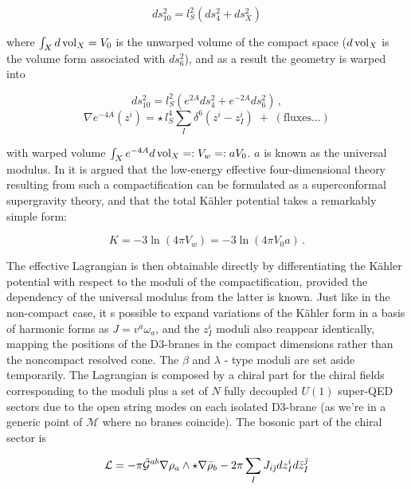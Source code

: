 \begin{equation}
	ds_{10}^2 = l_S^2 (ds^2_4 + ds^2_X)
	\label{}
\end{equation}

where $\int_X d\operatorname{vol}_X = V_0$ is the unwarped volume of the compact space ($d\operatorname{vol}_X$ is the volume form associated with $ds_6^2$), and as a result the geometry is warped into

\begin{equation}
	ds_{10}^2 = l_S^2 ( e^{2A} ds^2_4 + e^{-2A} ds^2_6 )\,,
\end{equation}
\begin{equation}
	\nabla e^{-4A}(z^i) = \star \, l_S^4 \sum_I \delta^6(z^i - z_I^i) \; + \; (\text {fluxes}\ldots)
	\label{}
\end{equation}

with warped volume $\int_X e^{-4A} d\operatorname{vol}_X =: V_w =: a V_0$. $a$ is known as the universal modulus. In \cite{MZ_2} it is argued that the low-energy effective four-dimensional theory resulting from such a compactification can be formulated as a superconformal supergravity theory, and that the total K\"ahler potential takes a remarkably simple form:

\begin{equation}
	K = -3 \ln(4\pi V_w) = -3 \ln(4 \pi V_0 a)\,.
	\label{}
\end{equation}

The effective Lagrangian is then obtainable directly by differentiating the K\"ahler potential with respect to the moduli of the compactification, provided the dependency of the universal modulus from the latter is known. Just like in the non-compact case, it s possible to expand variations of the K\"ahler form in a basis of harmonic forms as $J = v^a \omega_a$, and the $z_I^i$ moduli also reappear identically, mapping the positions of the D3-branes in the compact dimensions rather than the noncompact resolved cone. The $\beta$ and $\lambda$ - type moduli are set aside temporarily. The Lagrangian is composed by a chiral part for the chiral fields corresponding to the moduli plus a set of $N$ fully decoupled $U(1)$ super-QED sectors due to the open string modes on each isolated D3-brane (as we're in a generic point of $\mathcal{M}$ where no branes coincide). The bosonic part of the chiral sector is

\begin{equation}
	\mathcal{L} = - \pi \tilde{\mathcal{G}}^{ab} \nabla \rho_a \wedge \star \nabla \bar\rho_b - 2\pi \sum_I J_{i\bar{\jmath}} dz_I^i d\bar z_I^{\bar\jmath}
	\label{}
\end{equation}


